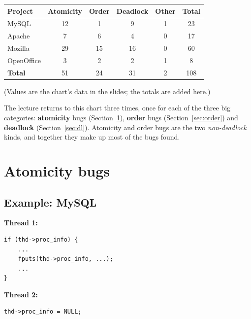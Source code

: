 \documentclass[11pt,a4paper]{article}
\begin{document}
\begin{center}
\small
\renewcommand{\arraystretch}{1.15}
\begin{tabular}{@{}lccccc@{}}
  \toprule
  \textbf{Project} & \textbf{Atomicity} & \textbf{Order} & \textbf{Deadlock} & \textbf{Other} & \textbf{Total} \\
  \midrule
  MySQL      & 12 & 1  & 9  & 1 & 23 \\
  Apache     & 7  & 6  & 4  & 0 & 17 \\
  Mozilla    & 29 & 15 & 16 & 0 & 60 \\
  OpenOffice & 3  & 2  & 2  & 1 & 8 \\
  \midrule
  \textbf{Total} & 51 & 24 & 31 & 2 & 108 \\
  \bottomrule
\end{tabular}

{\small (Values are the chart's data in the slides; the totals are added
here.)}
\end{center}

The lecture returns to this chart three times, once for each of the three big
categories: \textbf{atomicity} bugs (Section~\ref{sec:atom}), \textbf{order}
bugs (Section~\ref{sec:order}) and \textbf{deadlock} (Section~\ref{sec:dl}).
Atomicity and order bugs are the two \emph{non-deadlock} kinds, and together
they make up most of the bugs found.

\section{Atomicity bugs}\label{sec:atom}

\subsection{Example: MySQL}

\begin{center}
\begin{minipage}[t]{0.5\textwidth}
\textbf{Thread 1:}
\begin{lstlisting}[numbers=none]
if (thd->proc_info) {
    ...
    fputs(thd->proc_info, ...);
    ...
}
\end{lstlisting}
\end{minipage}\hfill
\begin{minipage}[t]{0.44\textwidth}
\textbf{Thread 2:}
\begin{lstlisting}[numbers=none]
thd->proc_info = NULL;
\end{lstlisting}
\end{minipage}
\end{center}
\end{document}
